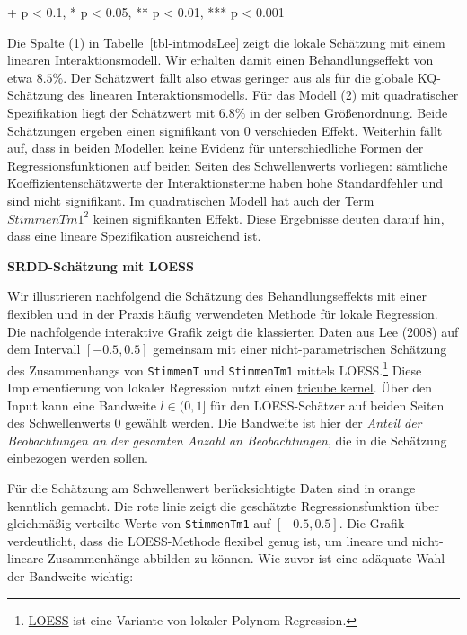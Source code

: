 \documentclass[
  a4paper,
  DIV=11,
  oneside]{scrreprt}
\begin{document}
\begin{minipage}{\linewidth}
+ p < 0.1, * p < 0.05, ** p < 0.01, *** p < 0.001\\
\end{minipage}
\endgroup

Die Spalte (1) in Tabelle~\ref{tbl-intmodsLee} zeigt die lokale
Schätzung mit einem linearen Interaktionsmodell. Wir erhalten damit
einen Behandlungseffekt von etwa \(8.5\%\). Der Schätzwert fällt also
etwas geringer aus als für die globale KQ-Schätzung des linearen
Interaktionsmodells. Für das Modell (2) mit quadratischer Spezifikation
liegt der Schätzwert mit \(6.8\%\) in der selben Größenordnung. Beide
Schätzungen ergeben einen signifikant von \(0\) verschieden Effekt.
Weiterhin fällt auf, dass in beiden Modellen keine Evidenz für
unterschiedliche Formen der Regressionsfunktionen auf beiden Seiten des
Schwellenwerts vorliegen: sämtliche Koeffizientenschätzwerte der
Interaktionsterme haben hohe Standardfehler und sind nicht signifikant.
Im quadratischen Modell hat auch der Term \(StimmenTm1^2\) keinen
signifikanten Effekt. Diese Ergebnisse deuten darauf hin, dass eine
lineare Spezifikation ausreichend ist.

\textbf{SRDD-Schätzung mit LOESS}

Wir illustrieren nachfolgend die Schätzung des Behandlungseffekts mit
einer flexiblen und in der Praxis häufig verwendeten Methode für lokale
Regression. Die nachfolgende interaktive Grafik zeigt die klassierten
Daten aus Lee (2008) auf dem Intervall \([-0.5,0.5]\) gemeinsam mit
einer nicht-parametrischen Schätzung des Zusammenhangs von
\texttt{StimmenT} und \texttt{StimmenTm1} mittels LOESS.\footnote{\href{https://en.wikipedia.org/wiki/Local_regression}{LOESS}
  ist eine Variante von lokaler Polynom-Regression.} Diese
Implementierung von lokaler Regression nutzt einen
\href{https://en.wikipedia.org/wiki/Kernel_(statistics)}{tricube
kernel}. Über den Input kann eine Bandweite \(l\in(0,1]\) für den
LOESS-Schätzer auf beiden Seiten des Schwellenwerts \(0\) gewählt
werden. Die Bandweite ist hier der \emph{Anteil der Beobachtungen an der
gesamten Anzahl an Beobachtungen}, die in die Schätzung einbezogen
werden sollen.

Für die Schätzung am Schwellenwert berücksichtigte Daten sind in orange
kenntlich gemacht. Die rote linie zeigt die geschätzte
Regressionsfunktion über gleichmäßig verteilte Werte von
\texttt{StimmenTm1} auf \([-0.5,0.5]\). Die Grafik verdeutlicht, dass
die LOESS-Methode flexibel genug ist, um lineare und nicht-lineare
Zusammenhänge abbilden zu können. Wie zuvor ist eine adäquate Wahl der
Bandweite wichtig:
\end{document}
